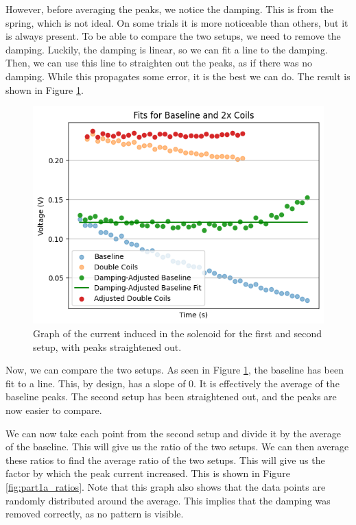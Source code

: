 \documentclass[11pt]{article}
\begin{document}
    However, before averaging the peaks, we notice the damping.
    This is from the spring, which is not ideal.
    On some trials it is more noticeable than others, but it is always present.
    To be able to compare the two setups, we need to remove the damping.
    Luckily, the damping is linear, so we can fit a line to the damping.
    Then, we can use this line to straighten out the peaks, as if there was no damping.
    While this propagates some error, it is the best we can do.
    The result is shown in Figure \ref{fig:part1a_straightened_points}.

    \begin{figure}[H]
        \centering
        \includegraphics[width=0.8\linewidth]{resources/images/part1a peaks straightened}
        \caption{Graph of the current induced in the solenoid for the first and second setup, with peaks straightened out.}
        \label{fig:part1a_straightened_points}
    \end{figure}

    Now, we can compare the two setups.
    As seen in Figure \ref{fig:part1a_straightened_points}, the baseline has been fit to a line.
    This, by design, has a slope of 0.
    It is effectively the average of the baseline peaks.
    The second setup has been straightened out, and the peaks are now easier to compare.

    We can now take each point from the second setup and divide it by the average of the baseline.
    This will give us the ratio of the two setups.
    We can then average these ratios to find the average ratio of the two setups.
    This will give us the factor by which the peak current increased.
    This is shown in Figure \ref{fig:part1a_ratios}.
    Note that this graph also shows that the data points are randomly distributed around the average.
    This implies that the damping was removed correctly, as no pattern is visible.
\end{document}
